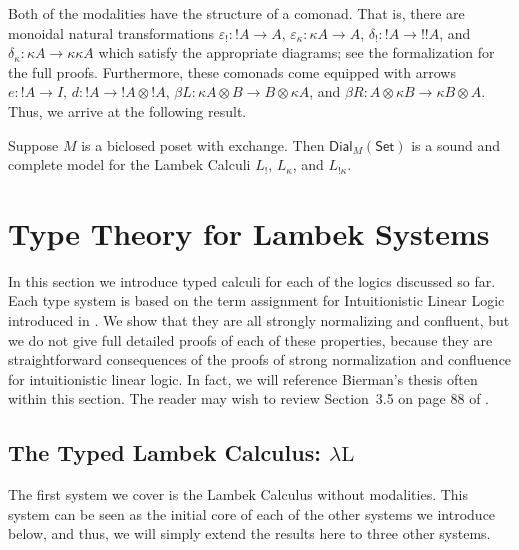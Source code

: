 \documentclass{llncs}
\let\mto\to                     %
\let\to\relax                   %
\newcommand{\to}{\rightarrow}
\newcommand{\Set}{\mathsf{Set}}
\newcommand{\Dial}[2]{\mathsf{Dial}_{#1}(#2)}
\begin{document}
Both of the modalities have the structure of a comonad.  That is,
there are monoidal natural transformations $\varepsilon_! : !A \mto
A$, $\varepsilon_\kappa : \kappa A \mto A$, $\delta_! : !A \mto !!A$,
and $\delta_\kappa : \kappa A \mto \kappa\kappa A$ which satisfy the
appropriate diagrams; see the formalization for the full
proofs. Furthermore, these comonads come equipped with arrows $e : !A
\mto I$, $d : !A \mto !A \otimes !A$, $\beta L : \kappa A \otimes B \mto B
\otimes \kappa A$, and $\beta R : A \otimes \kappa B \mto \kappa B
\otimes A$.  Thus, we arrive at the following result.

\begin{theorem}
  \label{theorem:sound-dial-exchange-!}
  Suppose $M$ is a biclosed poset with exchange.  Then
  $\Dial{M}{\Set}$ is a sound and complete model for the Lambek
  Calculi $L_!$, $L_\kappa$, and $L_{!\kappa}$.
\end{theorem}

\section{Type Theory for Lambek Systems}
\label{sec:typed_lambek_calculi}
In this section we introduce typed calculi for each of the logics
discussed so far.  Each type system is based on the term assignment
for  Intuitionistic Linear Logic introduced 
in \cite{benton1993}.
We show that they are all strongly normalizing
and confluent, but we do not give full detailed proofs of each of
these properties, because they are straightforward consequences of the
proofs of strong normalization and confluence for intuitionistic
linear logic.  In fact, we will reference Bierman's thesis often
within this section.  The reader may wish to review Section~3.5 on
page 88 of \cite{Bierman:1994}.

\subsection{The Typed Lambek Calculus: $\lambda\text{L}$}
\label{subsec:the_typed_lambek_calculus_lambda-l}

The first system we cover is the Lambek Calculus without
modalities. This system can be seen as the initial core of each of the
other systems we introduce below, and thus, we will simply extend the
results here to three other systems.  
\end{document}
